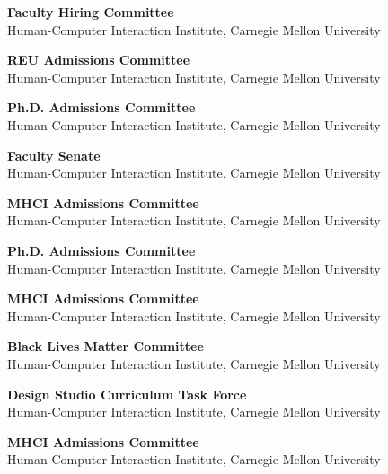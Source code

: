\documentclass[11pt]{article} %
\begin{document}
 \textbf{Faculty Hiring Committee}\\
Human-Computer Interaction Institute, Carnegie Mellon University
\medskip

 \textbf{REU Admissions Committee}\\
Human-Computer Interaction Institute, Carnegie Mellon University
\medskip

 \textbf{Ph.D. Admissions Committee}\\
Human-Computer Interaction Institute, Carnegie Mellon University
\medskip

 \textbf{Faculty Senate}\\
Human-Computer Interaction Institute, Carnegie Mellon University
\medskip

 \textbf{MHCI Admissions Committee}\\
Human-Computer Interaction Institute, Carnegie Mellon University
\medskip

 \textbf{Ph.D. Admissions Committee}\\
Human-Computer Interaction Institute, Carnegie Mellon University
\medskip

 \textbf{MHCI Admissions Committee}\\
Human-Computer Interaction Institute, Carnegie Mellon University
\medskip

 \textbf{Black Lives Matter Committee}\\
Human-Computer Interaction Institute, Carnegie Mellon University
\medskip

 \textbf{Design Studio Curriculum Task Force}\\
Human-Computer Interaction Institute, Carnegie Mellon University
\medskip

 \textbf{MHCI Admissions Committee}\\
Human-Computer Interaction Institute, Carnegie Mellon University
\medskip



\vfill %





\end{document}
